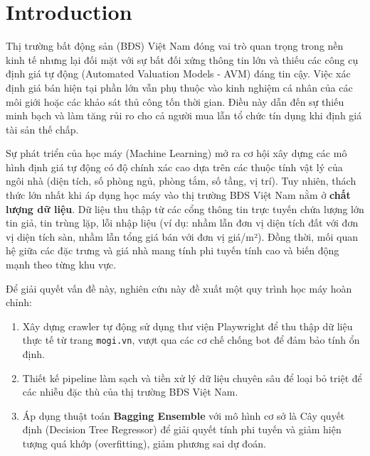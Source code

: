 \documentclass[sigconf]{acmart}
\begin{document}

\maketitle


\section{Introduction}
Thị trường bất động sản (BĐS) Việt Nam đóng vai trò quan trọng trong nền kinh tế nhưng lại đối mặt với sự bất đối xứng thông tin lớn và thiếu các công cụ định giá tự động (Automated Valuation Models - AVM) đáng tin cậy. Việc xác định giá bán hiện tại phần lớn vẫn phụ thuộc vào kinh nghiệm cá nhân của các môi giới hoặc các khảo sát thủ công tốn thời gian. Điều này dẫn đến sự thiếu minh bạch và làm tăng rủi ro cho cả người mua lẫn tổ chức tín dụng khi định giá tài sản thế chấp.

Sự phát triển của học máy (Machine Learning) mở ra cơ hội xây dựng các mô hình định giá tự động có độ chính xác cao dựa trên các thuộc tính vật lý của ngôi nhà (diện tích, số phòng ngủ, phòng tắm, số tầng, vị trí). Tuy nhiên, thách thức lớn nhất khi áp dụng học máy vào thị trường BĐS Việt Nam nằm ở \textbf{chất lượng dữ liệu}. Dữ liệu thu thập từ các cổng thông tin trực tuyến chứa lượng lớn tin giả, tin trùng lặp, lỗi nhập liệu (ví dụ: nhầm lẫn đơn vị diện tích đất với đơn vị diện tích sàn, nhầm lẫn tổng giá bán với đơn vị giá/m²). Đồng thời, mối quan hệ giữa các đặc trưng và giá nhà mang tính phi tuyến tính cao và biến động mạnh theo từng khu vực.

Để giải quyết vấn đề này, nghiên cứu này đề xuất một quy trình học máy hoàn chỉnh:
\begin{enumerate}
    \item Xây dựng crawler tự động sử dụng thư viện Playwright để thu thập dữ liệu thực tế từ trang \texttt{mogi.vn}, vượt qua các cơ chế chống bot để đảm bảo tính ổn định.
    \item Thiết kế pipeline làm sạch và tiền xử lý dữ liệu chuyên sâu để loại bỏ triệt để các nhiễu đặc thù của thị trường BĐS Việt Nam.
    \item Áp dụng thuật toán \textbf{Bagging Ensemble} với mô hình cơ sở là Cây quyết định (Decision Tree Regressor) để giải quyết tính phi tuyến và giảm hiện tượng quá khớp (overfitting), giảm phương sai dự đoán.
\end{enumerate}
\end{document}
